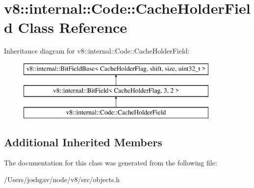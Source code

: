 \hypertarget{classv8_1_1internal_1_1_code_1_1_cache_holder_field}{}\section{v8\+:\+:internal\+:\+:Code\+:\+:Cache\+Holder\+Field Class Reference}
\label{classv8_1_1internal_1_1_code_1_1_cache_holder_field}
Inheritance diagram for v8\+:\+:internal\+:\+:Code\+:\+:Cache\+Holder\+Field\+:\begin{figure}[H]
\begin{center}
\leavevmode
\includegraphics[height=3.000000cm]{classv8_1_1internal_1_1_code_1_1_cache_holder_field}
\end{center}
\end{figure}
\subsection*{Additional Inherited Members}


The documentation for this class was generated from the following file\+:\begin{DoxyCompactItemize}
\item 
/\+Users/joshgav/node/v8/src/objects.\+h\end{DoxyCompactItemize}
